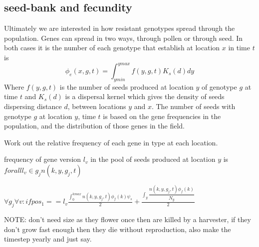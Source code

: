 \documentclass[12pt, a4paper]{article}
\begin{document}
\subsection*{seed-bank and fecundity}
Ultimately we are interested in how resistant genotypes spread through the population. Genes can spread in two ways, through pollen or through seed. In both cases it is the number of each genotype that establish at location $x$ in time $t$ is 
\begin{equation}\label{eq:estab}
	\phi_e(x, g, t) = \displaystyle\int_{y min}^{y max}f(y, g, t)K_s(d)dy
\end{equation}
Where $f(y, g, t)$ is the number of seeds produced at location $y$ of genotype $g$ at time $t$ and $K_s(d)$ is a dispersal kernel which gives the density of seeds dispersing distance $d$, between locations $y$ and $x$. The number of seeds with genotype $g$ at location $y$, time $t$ is based on the gene frequencies in the population, and the distribution of those genes in the field. 

Work out the relative frequency of each gene in type at each location. 

frequency of gene version $l_v$ in the pool of seeds produced at location $y$ is $forall l_v \in g_j n(k, y, g_j, t)$     

$\forall g_j \forall v : if pos_1 == l_v  \frac{\int_{0}^{k max}n(k, y, g_j, t)\phi_f(k)\psi_s}{2} + \frac{\int_y\dfrac{n(k, y, g_j, t)\phi_f(k)}{N_{y}}}{2}$

NOTE: don't need size as they flower once then are killed by a harvester, if they don't grow fast enough then they die without reproduction, also make the timestep yearly and just say.  
\end{document}
